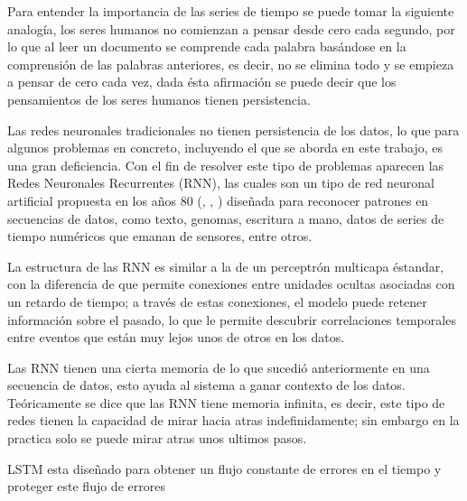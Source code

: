 Para entender la importancia de las series de tiempo se puede tomar la siguiente analog\'{i}a, los seres humanos no comienzan a pensar desde cero cada segundo, por lo que al leer un documento se comprende cada palabra bas\'{a}ndose en la comprensi\'{o}n de las palabras anteriores, es decir, no se elimina todo y se empieza a pensar de cero cada vez, dada \'{e}sta afirmaci\'{o}n se puede decir que los pensamientos de los seres humanos tienen persistencia.

\vspace{5mm} %

Las redes neuronales tradicionales no tienen persistencia de los datos, lo que para algunos problemas en concreto, incluyendo el que se aborda en este trabajo, es una gran deficiencia. Con el fin de resolver este tipo de problemas aparecen las Redes Neuronales Recurrentes (RNN), las cuales son un tipo de red neuronal artificial propuesta en los a\~{n}os 80 (\cite{34}, \cite{35}, \cite{36}) dise\~{n}ada para reconocer patrones en secuencias de datos, como texto, genomas, escritura a mano, datos de series de tiempo num\'{e}ricos que emanan de sensores, entre otros.

\vspace{5mm} %

La estructura de las RNN es similar a la de un perceptr\'{o}n multicapa \'{e}standar, con la diferencia de que permite conexiones entre unidades ocultas asociadas con un retardo de tiempo; a trav\'{e}s de estas conexiones, el modelo puede retener informaci\'{o}n sobre el pasado, lo que le permite descubrir correlaciones temporales entre eventos que est\'{a}n muy lejos unos de otros en los datos.

Las RNN tienen una cierta memoria de lo que sucedi\'{o} anteriormente en una secuencia de datos, esto ayuda al sistema a ganar contexto de los datos. Te\'{o}ricamente se dice que las RNN tiene memoria infinita, es decir, este tipo de redes tienen la capacidad de mirar hacia atras indefinidamente; sin embargo en la practica solo se puede mirar atras unos ultimos pasos.

LSTM esta dise\~{n}ado para obtener un flujo constante de errores en el tiempo y proteger este flujo de errores

